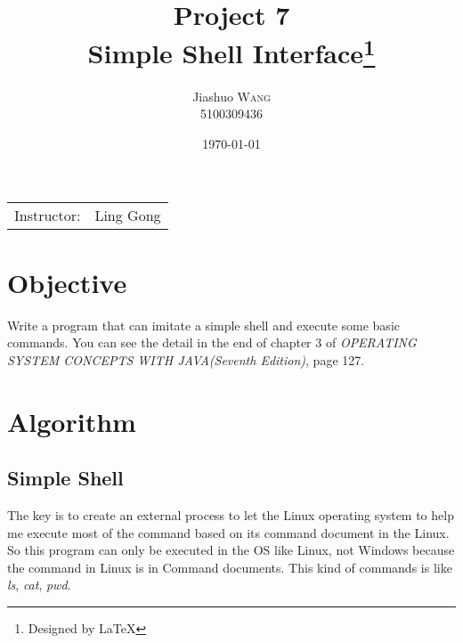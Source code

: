 \documentclass{article}
\title{Project 7 \\ Simple Shell Interface\thanks{Designed by \LaTeX}} %
\author{Jiashuo \textsc{Wang} \\ 5100309436} %
\date{\today} %
\begin{document}
\maketitle %
\thispagestyle{fancy} %

\begin{center}
\begin{tabular}{l r}
Instructor: & Ling Gong %
\end{tabular}
\end{center}




\section{Objective}

Write a program that can imitate a simple shell and execute some basic commands. You can see the detail in the end of chapter 3 of \emph{OPERATING SYSTEM CONCEPTS WITH JAVA(Seventh Edition)}, page 127.




\section{Algorithm}

\subsection{Simple Shell}
The key is to create an external process to let the Linux operating system to help me execute most of the command based on its command document in the Linux. So this program can only be executed in the OS like Linux, not Windows because the command in Linux is in Command documents. This kind of commands is like \emph{ls}, \emph{cat}, \emph{pwd}.
\end{document}
